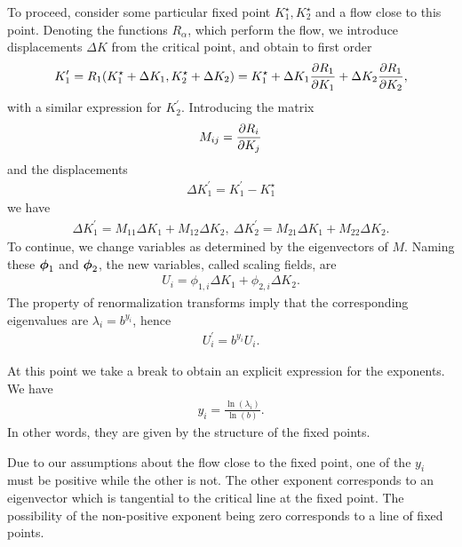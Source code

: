 To proceed, consider some particular fixed point $K_{1}^{\star}, K_{2}^{\star}$ and a flow close to this point. Denoting the functions $R_{\alpha}$, which perform the flow, we introduce displacements $\Delta K$ from the critical point, and obtain to first order
\begin{align*}
	K_{1}^{\prime} = R_{1}(K_{1}^{\star} + \Delta K_{1}, K_{2}^{\star} + \Delta K_{2}) = K_{1}^{\star} + \Delta K_{1}\pdv{R_{1}}{K_{1}} + \Delta K_{2}\pdv{R_{1}}{K_{2}},
\end{align*}
with a similar expression for $K_{2}^{\prime}$. Introducing the matrix
\begin{align*}
M_{ij} = \pdv{R_{i}}{K_{j}}
\end{align*}
and the displacements
\begin{align*}
	\Delta K_{1}^{\prime} = K_{1}^{\prime} - K_{1}^{\star}
\end{align*}
we have
\begin{align*}
	\Delta K_{1}^{\prime} = M_{11}\Delta K_{1} + M_{12}\Delta K_{2},\ \Delta K_{2}^{\prime} = M_{21}\Delta K_{1} + M_{22}\Delta K_{2}.
\end{align*}
To continue, we change variables as determined by the eigenvectors of $M$. Naming these $\vb*{\phi}_{1}$ and $\vb*{\phi}_{2}$, the new variables, called scaling fields, are
\begin{align*}
	U_{i} = \phi_{1, i}\Delta K_{1} + \phi_{2, i}\Delta K_{2}.
\end{align*}
The property of renormalization transforms imply that the corresponding eigenvalues are $\lambda_{i} = b^{y_{i}}$, hence
\begin{align*}
	U_{i}^{\prime} = b^{y_{i}}U_{i}.
\end{align*}

At this point we take a break to obtain an explicit expression for the exponents. We have
\begin{align*}
	y_{i} = \frac{\ln(\lambda_{i})}{\ln(b)}.
\end{align*}
In other words, they are given by the structure of the fixed points.

Due to our assumptions about the flow close to the fixed point, one of the $y_{i}$ must be positive while the other is not. The other exponent corresponds to an eigenvector which is tangential to the critical line at the fixed point. The possibility of the non-positive exponent being zero corresponds to a line of fixed points.

